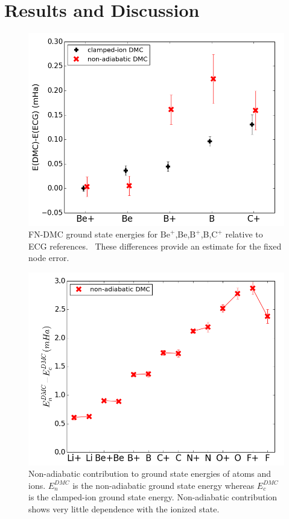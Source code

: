 \documentclass[pra,superscriptaddress,groupedaddress,twocolumn]{revtex4}
\begin{document}
\section{Results and Discussion}


\begin{figure}
\centering
\includegraphics[scale=.4]{Figures/atom-ECG}
\caption{FN-DMC ground state energies for $\text{Be}^+$,Be,$\text{B}^+$,B,$\text{C}^+$ relative to ECG references.~\cite{Stanke_Be,Puchalski_Be+,Bubin_BeH_noBO,Bubin_B,Bubin_B+,Bubin_C+} These differences provide an estimate for the fixed node error. \label{fig:atom-ECG}}
\end{figure}

\begin{figure}
\includegraphics[scale=.37]{Figures/atom-nad-ad}
\caption{Non-adiabatic contribution to ground state energies of atoms and ions. $E_n^{DMC}$ is the non-adiabatic ground state energy whereas $E_c^{DMC}$ is the clamped-ion ground state energy. Non-adiabatic contribution shows very little dependence with the ionized state.}
\end{figure}
\end{document}
